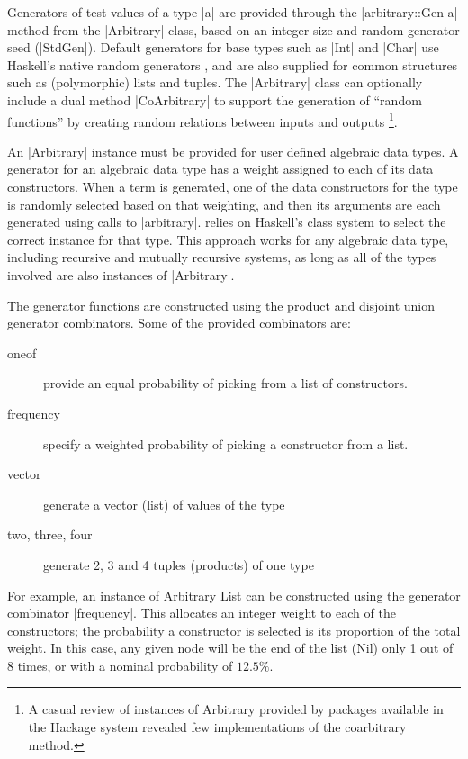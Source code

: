 Generators of test values of a type |a| are provided through 
the |arbitrary::Gen a| method from the |Arbitrary| class,
based on an integer size and random generator seed (|StdGen|).
Default generators for base types such as |Int| and |Char|
use Haskell's native random generators ,
and are also supplied for common structures such as (polymorphic) lists and tuples.
The |Arbitrary| class can optionally include a dual method |CoArbitrary|
to support the generation of ``random functions'' by 
creating random relations between inputs and outputs%
\footnote{A casual review of instances of Arbitrary provided by
packages available in the Hackage system revealed
few implementations of the coarbitrary method.}.

An |Arbitrary| instance must be provided for user defined algebraic data types.
A generator for an algebraic data type has a weight assigned 
to each of its data constructors.
When a term is generated, 
one of  the data constructors for the type is randomly selected based on that weighting,
and then its arguments are each generated using calls to |arbitrary|.
\GC relies on Haskell's class system to select the correct instance for that type.
This approach works for any algebraic data type, 
including recursive and mutually recursive systems, 
as long as all of the types involved are also instances of |Arbitrary|.

The generator functions are constructed using 
the \QC  product and disjoint union generator combinators.
Some of the provided combinators are:

\begin{description}
\item [oneof] provide an equal probability of picking from a list of constructors.
\item [frequency] specify a weighted probability of picking a constructor from a list.
\item [vector] generate a vector (list) of values of the type
\item [two, three, four] generate 2, 3 and 4 tuples (products) of one type
\end{description}

\noindent
For example, an instance of Arbitrary List can be constructed using 
the generator combinator |frequency|.
This allocates an integer weight to each of the constructors;
the probability a constructor is selected is its proportion of the total weight.
In this case, any given node will be the end of the list (Nil) only 1 out of 8 times,
or with a nominal probability of $12.5\%$.

